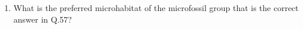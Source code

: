 \documentclass[journal,12pt,onecolumn,fleqn]{IEEEtran}
\theoremstyle{remark}
\theoremstyle{remark}
\begin{document}
\begin{enumerate}[label=Q.\arabic*.]
            \begin {enumerate}
            \end{enumerate}
    \item What is the preferred microhabitat of the microfossil group that is the correct answer in Q.57? \hfill{} 
            \begin {enumerate}
            \end{enumerate}

\end{enumerate}
\end{document}
